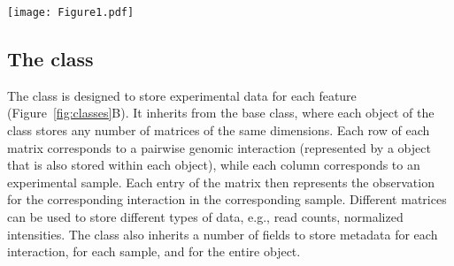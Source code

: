 \documentclass[10pt,a4paper,twocolumn]{article}
\begin{document}
\begin{figure*}
\centering
\texttt{[image: Figure1.pdf]}
\caption{Overview of the classes in the \textit{InteractionSet} package.
Relevant slots of each class (i.e., data values stored in each object of the class) are labelled with a preceding ``@''.
(A) The  class represents pairwise interactions between genomic regions by storing pairs of anchor indices that refer to coordinates in a  object.
(B) The  class stores experimental data in an ``assays'' matrix where each row is an interaction and each column is a sample.
Here, counts represent the number of read pairs mapped between each pair of interacting regions in each sample.
(C) The  class represents the interaction space as a matrix, where each cell represents an interaction between the corresponding row/column regions.
}
\label{fig:classes}
\end{figure*}

\subsection*{The  class}
The  class is designed to store experimental data for each feature (Figure~\ref{fig:classes}B).
It inherits from the  base class, where each object of the class stores any number of matrices of the same dimensions.
Each row of each matrix corresponds to a pairwise genomic interaction (represented by a  object that is also stored within each  object), while each column corresponds to an experimental sample.
Each entry of the matrix then represents the observation for the corresponding interaction in the corresponding sample.
Different matrices can be used to store different types of data, e.g., read counts, normalized intensities.
The  class also inherits a number of fields to store metadata for each interaction, for each sample, and for the entire object.
\end{document}
